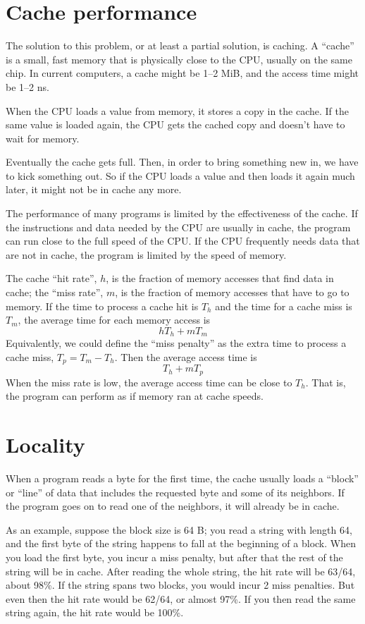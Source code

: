 \documentclass[12pt]{book}
\begin{document}
\section{Cache performance}

The solution to this problem, or at least a partial solution, is
caching.  A ``cache'' is a small, fast memory that is physically close
to the CPU, usually on the same chip.  In current computers, a cache might be 1--2 MiB, and the access time might be 1--2 ns.

When the CPU loads a value from memory, it stores a copy in the cache.
If the same value is loaded again, the CPU gets the cached copy
and doesn't have to wait for memory.

Eventually the cache gets full.  Then, in order to bring something
new in, we have to kick something out.  So if the CPU loads a value
and then loads it again much later, it might not be in cache any more.

The performance of many programs is limited by the effectiveness
of the cache.  If the instructions and data needed by the CPU are usually in cache, the program can run close to the full speed of the CPU.  If the CPU
frequently needs data that are not in cache, the program is
limited by the speed of memory.

The cache ``hit rate'', $h$, is the fraction of memory accesses that
find data in cache; the ``miss rate'', $m$, is the fraction of memory
accesses that have to go to memory.  If the time to process a cache
hit is $T_h$ and the time for a cache miss is $T_m$, the average time
for each memory access is
%
\[ h T_h + m T_m \]
%
Equivalently, we could define the ``miss penalty'' as the extra
time to process a cache miss, $T_p = T_m - T_h$.  Then the average access
time is
%
\[ T_h + m T_p \]
%
When the miss rate is low, the average access time can be close to
$T_h$.  That is, the program can perform as if memory ran at
cache speeds.


\section{Locality}

When a program reads a byte for the first time, the cache usually
loads a ``block'' or ``line'' of data that includes the requested
byte and some of its neighbors.  If the program goes on to read one
of the neighbors, it will already be in cache.

As an example, suppose the block size is 64 B;
you read a string with length 64, and the first
byte of the string happens to fall at the beginning of a block.  When
you load the first byte, you incur a miss penalty, but
after that the rest of the string will be in cache.  After
reading the whole string, the hit rate will be 63/64, about 98\%.
If the string spans two blocks, you would incur 2 miss penalties.  But
even then the hit rate would be 62/64, or almost 97\%.  If you then
read the same string again, the hit rate would be 100\%.
\end{document}
